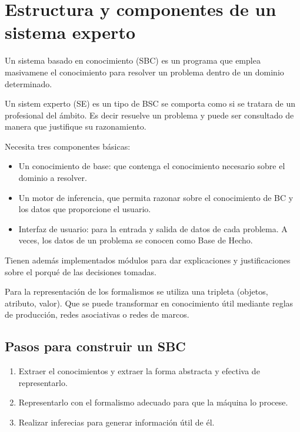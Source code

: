 \documentclass[12 pt, a4paper]{article}
\begin{document}
\newpage


\section{Estructura y componentes de un sistema experto }

Un sistema basado en conocimiento (SBC) es un programa que emplea masivamene el conocimiento para resolver
un problema  dentro de un dominio determinado. 

Un sistem experto (SE) es un tipo de BSC se comporta como si se tratara de un profesional del ámbito. 
Es decir resuelve un problema y puede ser consultado de manera que justifique su razonamiento. 

Necesita tres componentes básicas: 

\begin{itemize}
  \item Un conocimiento de base: que contenga el conocimiento necesario sobre el dominio a resolver. 
  \item Un motor de inferencia, que permita razonar sobre el conocimiento de BC y los datos que proporcione el usuario. 
  \item Interfaz de usuario: para la entrada y salida de datos de cada problema. A veces, los datos de un problema se conocen como Base de Hecho.
\end{itemize}

Tienen además implementados módulos para dar explicaciones y justificaciones sobre el porqué de las decisiones tomadas. 

Para la representación de los formalismos se utiliza una tripleta (objetos, atributo, valor). Que se puede transformar en conocimiento útil 
mediante reglas de producción, redes asociativas o redes de marcos. 

\subsection*{Pasos para construir un SBC}  

\begin{enumerate}
  \item Extraer el conocimientos y extraer la forma abstracta y efectiva de representarlo. 
  \item Representarlo con el formalismo adecuado para que la máquina lo procese.
  \item Realizar inferecias para generar información 
  útil de él. 
\end{enumerate}
\end{document}
